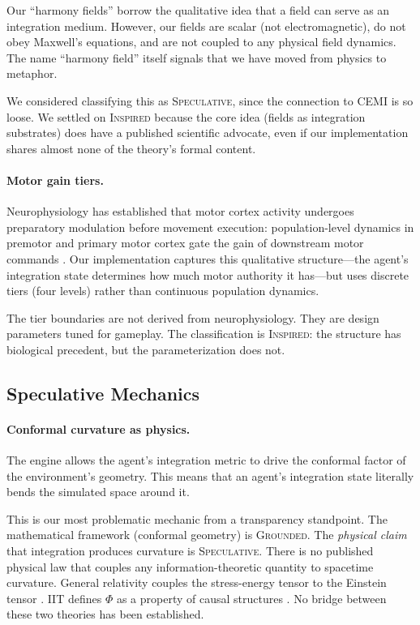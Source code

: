 \documentclass[12pt,a4paper]{article}
\begin{document}
Our ``harmony fields'' borrow the qualitative idea that a field
can serve as an integration medium.  However, our fields are
scalar (not electromagnetic), do not obey Maxwell's equations,
and are not coupled to any physical field dynamics.  The
name ``harmony field'' itself signals that we have moved from
physics to metaphor.

We considered classifying this as \textsc{Speculative}, since
the connection to CEMI is so loose.  We settled on
\textsc{Inspired} because the core idea (fields as integration
substrates) does have a published scientific advocate, even if
our implementation shares almost none of the theory's formal
content.

\paragraph{Motor gain tiers.}
Neurophysiology has established that motor cortex activity
undergoes preparatory modulation before movement execution:
population-level dynamics in premotor and primary motor cortex
gate the gain of downstream motor commands
\citep{kaufman2014}.  Our implementation captures this
qualitative structure---the agent's integration state determines
how much motor authority it has---but uses discrete tiers
(four levels) rather than continuous population dynamics.

The tier boundaries are not derived from neurophysiology.  They
are design parameters tuned for gameplay.  The classification is
\textsc{Inspired}: the structure has biological precedent, but
the parameterization does not.

\subsection{Speculative Mechanics}

\paragraph{Conformal curvature as physics.}
The engine allows the agent's integration metric to drive the
conformal factor of the environment's geometry.  This means that
an agent's integration state literally bends the simulated
space around it.

This is our most problematic mechanic from a transparency
standpoint.  The mathematical framework (conformal geometry) is
\textsc{Grounded}.  The \emph{physical claim} that integration
produces curvature is \textsc{Speculative}.  There is no
published physical law that couples any information-theoretic
quantity to spacetime curvature.  General relativity couples the
stress-energy tensor to the Einstein tensor
\citep{carroll2004}.  IIT defines $\Phi$ as a property of
causal structures \citep{tononi2004}.  No bridge between these
two theories has been established.
\end{document}
